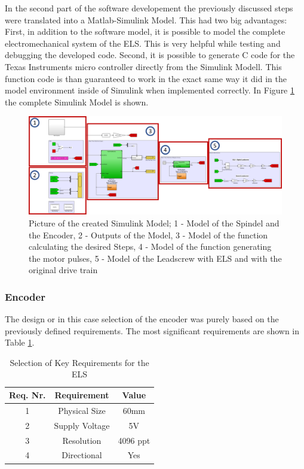 In the second part of the software developement the previously discussed steps were translated into a Matlab-Simulink Model. This had two big advantages: First, in addition to the software model, it is possible to model the complete electromechanical system of the ELS. This is very helpful while testing and debugging the developed code. Second, it is possible to generate C code for the Texas Instruments micro controller directly from the Simulink Modell. This function code is than guaranteed to work in the exact same way it did in the model environment inside of Simulink when implemented correctly. In Figure \ref{Simulink Model} the complete Simulink Model is shown.

\begin{figure}
    \begin{center}
    \includegraphics[width=12cm]{Pictures/SimulinkModell.png}
    \caption[Picture of the created Simulink Model]{Picture of the created Simulink Model; 1 - Model of the Spindel and the Encoder, 2 - Outputs of the Model, 3 - Model of the function calculating the desired Steps, 4 - Model of the function generating the motor pulses, 5 - Model of the Leadscrew with ELS and with the original drive train}
    \label{Simulink Model}
    \end{center}
\end{figure}


\subsubsection{Encoder}
The design or in this case selection of the encoder was purely based on the previously defined requirements. The most significant requirements are shown in Table \ref{Tab Encoder Key Requirements}.

\begin{table}
    \centering
     \begin{tabular}{||c|c|c||} 
        \hline
        Req. Nr. & Requirement & Value\\ [0.5ex] 
        \hline\hline
        1 & Physical Size       & 60mm		\\ 
        2 & Supply Voltage      & 5V        \\
        3 & Resolution          & 4096 ppt  \\
        4 & Directional         & Yes       \\[1ex] 
        \hline
     \end{tabular}
     \caption{Selection of Key Requirements for the ELS}
     \label{Tab Encoder Key Requirements}
\end{table}

